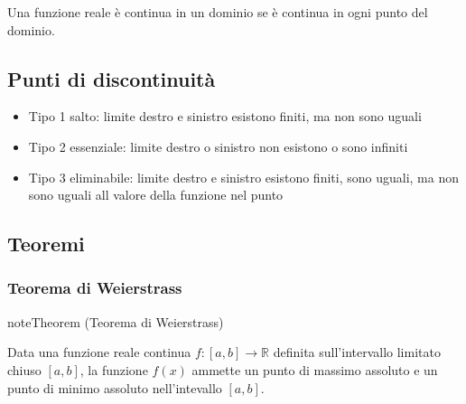 \documentclass[letterpaper,10pt,italian]{jupyterBook}
\begin{document}
\sphinxAtStartPar
Una funzione reale è continua in un dominio  se è continua in ogni punto del dominio.


\subsection{Punti di discontinuità}
\label{\detokenize{ch/infinitesimal_calculus/analysis:punti-di-discontinuita}}\label{\detokenize{ch/infinitesimal_calculus/analysis:infinitesimal-calculus-continuous-fun-disc}}\begin{itemize}
\item {} 
\sphinxAtStartPar
Tipo 1 \sphinxhyphen{} salto: limite destro e sinistro esistono finiti, ma non sono uguali

\item {} 
\sphinxAtStartPar
Tipo 2 \sphinxhyphen{} essenziale: limite destro o sinistro non esistono o sono infiniti

\item {} 
\sphinxAtStartPar
Tipo 3 \sphinxhyphen{} eliminabile: limite destro e sinistro esistono finiti, sono uguali, ma non sono uguali all valore della funzione nel punto

\end{itemize}

\sphinxAtStartPar
{} 


\subsection{Teoremi}
\label{\detokenize{ch/infinitesimal_calculus/analysis:teoremi}}\label{\detokenize{ch/infinitesimal_calculus/analysis:infinitesimal-calculus-continuous-fun-thms}}

\subsubsection{Teorema di Weierstrass}
\label{\detokenize{ch/infinitesimal_calculus/analysis:teorema-di-weierstrass}}\label{\detokenize{ch/infinitesimal_calculus/analysis:infinitesimal-calculus-continuous-fun-thms-weierstrass}}\label{None:thm:infinitesimal-calculus:continuous-fun:thms:weierstrass}
\begin{sphinxadmonition}{note}{Theorem  (Teorema di Weierstrass)}



\sphinxAtStartPar
Data una funzione reale continua \(f: [a,b] \rightarrow \mathbb{R}\) definita sull’intervallo limitato chiuso \([a,b]\), la funzione \(f(x)\) ammette un punto di massimo assoluto e un punto di minimo assoluto nell’intevallo \([a,b]\).
\end{sphinxadmonition}
\end{document}
